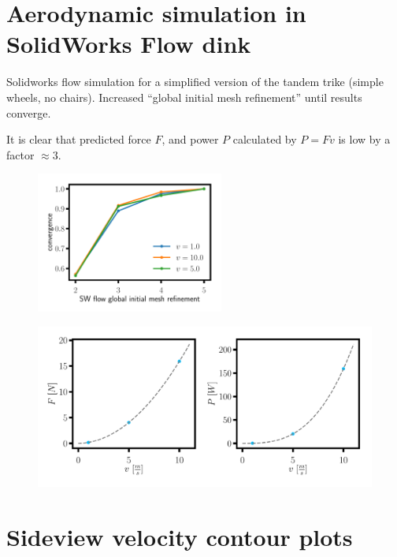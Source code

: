 \documentclass[11pt]{article}
\begin{document}
\section*{Aerodynamic simulation in SolidWorks Flow dink}

Solidworks flow simulation for a simplified version of the tandem trike (simple wheels, no chairs).
Increased ``global initial mesh refinement'' until results converge.

It is clear that predicted force $F$, and power $P$ calculated by $P = F v$ is low by a factor $\approx 3$. 

\begin{figure}[h!]
\centering
\includegraphics[width=0.55\textwidth]{convergence.pdf}
\end{figure}

\begin{figure}[h!]
\centering
\includegraphics[width=\textwidth]{ForcePower.pdf}
\end{figure}

\section*{Sideview velocity contour plots}
\end{document}
